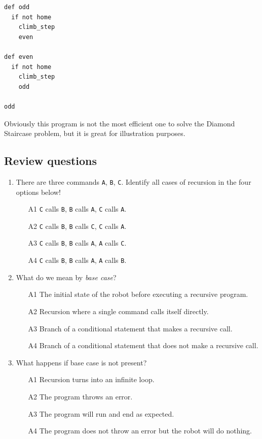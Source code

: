 \documentclass[article,A4,12pt]{llncs}
\begin{document}
{{{{\begin{verbatim}
def odd
  if not home
    climb_step
    even
    
def even
  if not home
    climb_step
    odd
    
odd
\end{verbatim}
Obviously this program is not the most efficient one to solve the 
Diamond Staircase problem, but it is great for illustration purposes.

\subsection{Review questions}

\begin{enumerate}
\item There are three commands {\tt A}, {\tt B}, {\tt C}. Identify all cases of recursion in the four options below!
\begin{enumerate}
\item[A1] {\tt C} calls {\tt B}, {\tt B} calls {\tt A}, {\tt C} calls {\tt A}.
\item[A2] {\tt C} calls {\tt B}, {\tt B} calls {\tt C}, {\tt C} calls {\tt A}.
\item[A3] {\tt C} calls {\tt B}, {\tt B} calls {\tt A}, {\tt A} calls {\tt C}.
\item[A4] {\tt C} calls {\tt B}, {\tt B} calls {\tt A}, {\tt A} calls {\tt B}.
\end{enumerate}
\item What do we mean by {\em base case}?
\begin{enumerate}
\item[A1] The initial state of the robot before executing a recursive program.
\item[A2] Recursion where a single command calls itself directly.
\item[A3] Branch of a conditional statement that makes a recursive call.
\item[A4] Branch of a conditional statement that does not make a recursive call.
\end{enumerate}
\item What happens if base case is not present?
\begin{enumerate}
\item[A1] Recursion turns into an infinite loop.
\item[A2] The program throws an error.
\item[A3] The program will run and end as expected.
\item[A4] The program does not throw an error but the robot will do nothing.

\end{enumerate}
\end{enumerate}}}}}
\end{document}
